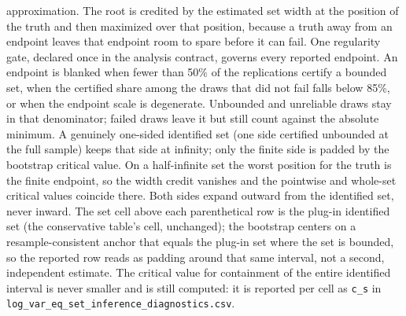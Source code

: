 \documentclass[11pt]{article}
\begin{document}
\begin{table}[!htbp]
\begin{threeparttable}
\begin{tablenotes}[flushleft]
approximation. The root is credited by the estimated set width at the position of the truth and then maximized over that position, because a truth away from an endpoint leaves that endpoint room to spare before it can fail. One regularity gate, declared once in the analysis contract, governs every reported endpoint. An endpoint is blanked when fewer than 50\% of the replications certify a bounded set, when the certified share among the draws that did not fail falls below 85\%, or when the endpoint scale is degenerate. Unbounded and unreliable draws stay in that denominator; failed draws leave it but still count against the absolute minimum. A genuinely one-sided identified set (one side certified unbounded at the full sample) keeps that side at infinity; only the finite side is padded by the bootstrap critical value. On a half-infinite set the worst position for the truth is the finite endpoint, so the width credit vanishes and the pointwise and whole-set critical values coincide there. Both sides expand outward from the identified set, never inward. The set cell above each parenthetical row is the plug-in identified set (the conservative table's cell, unchanged); the bootstrap centers on a resample-consistent anchor that equals the plug-in set where the set is bounded, so the reported row reads as padding around that same interval, not a second, independent estimate. The critical value for containment of the entire identified interval is never smaller and is still computed: it is reported per cell as \texttt{c\_s} in \texttt{log\_var\_eq\_set\_inference\_diagnostics.csv}.
\end{tablenotes}
\end{threeparttable}
\end{table}
\clearpage
\end{document}

